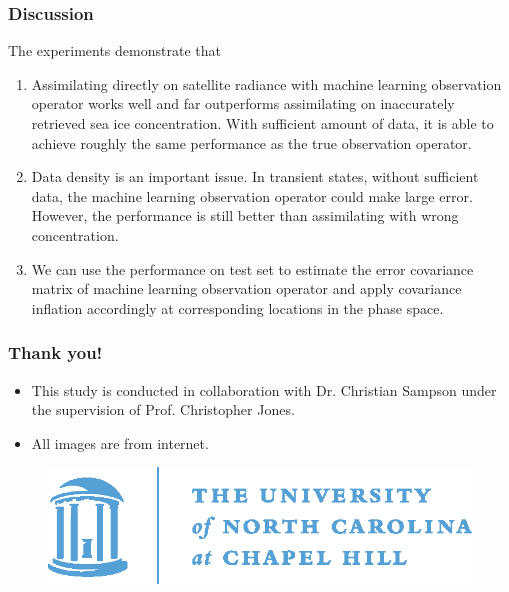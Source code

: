 \documentclass{beamer}
\begin{document}
\begin{frame}
\frametitle{Discussion}
The experiments demonstrate that
\begin{enumerate}
	\item Assimilating directly on satellite radiance with machine learning observation operator works well and far outperforms assimilating on inaccurately retrieved sea ice concentration. With sufficient amount of data, it is able to achieve roughly the same performance as the true observation operator.
	\item Data density is an important issue. In transient states, without sufficient data, the machine learning observation operator could make large error. However, the performance is still better than assimilating with wrong concentration.
	\item We can use the performance on test set to estimate the error covariance matrix of machine learning observation operator and apply covariance inflation accordingly at corresponding locations in the phase space.
\end{enumerate}
\end{frame}

\begin{frame}
\frametitle{Thank you!}

\begin{itemize}
\item This study is conducted in collaboration with Dr. Christian Sampson under the supervision of Prof. Christopher Jones.
\item All images are from internet.
\end{itemize}

\begin{figure}
\centering
\includegraphics[width=0.6\linewidth]{oldwell_cmyk}
\end{figure}
\end{frame}
%
\end{document}
